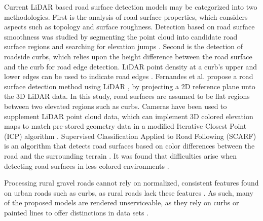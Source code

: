 \documentclass[journal,onecolumn]{IEEEtran}
\begin{document}
	{Current LiDAR based road surface detection models may be categorized into two methodologies. First is the analysis of road surface properties, which considers aspects such as topology and surface roughness. Detection based on road surface smoothness was studied by segmenting the point cloud into candidate road surface regions and searching for elevation jumps \cite{liu_new_2013}. Second is the detection of roadside curbs, which relies upon the height difference between the road surface and the curb for road edge detection. LiDAR point density at a curb's upper and lower edges can be used to indicate road edges \cite{ibrahim_curb-based_2012}. Fernandes et al. propose a road surface detection method using LiDAR \cite{fernandes_road_2014}, by projecting a 2D reference plane unto the 3D LiDAR data. In this study, road surfaces are assumed to be flat regions between two elevated regions such as curbs. Cameras have been used to supplement LiDAR point cloud data, which can implement 3D colored elevation maps to match pre-stored geometry data in a modified Iterative Closest Point (ICP) algorithm \cite{manz_detection_2011}. Supervised Classification Applied to Road Following (SCARF) is an algorithm that detects road surfaces based on color differences between the road and the surrounding terrain \cite{crisman_scarf_1993}. It was found that difficulties arise when detecting road surfaces in less colored environments \cite{crisman_scarf_1993,manz_detection_2011}.}
	
	{Processing rural gravel roads cannot rely on normalized, consistent features found on urban roads such as curbs, as rural roads lack these features \cite{skorseth_gravel_nodate}. As such, many of the proposed models are rendered unserviceable, as they rely on curbs or painted lines to offer distinctions in data sets \cite{yadav_extraction_2017,liu_new_2013,qiu_fast_2016,fernandes_road_2014,seker_experiments_nodate,yang_semi-automated_2013,miyazaki_line-based_2014,hervieu_road_2013,smadja_road_nodate}.}
	
\end{document}
